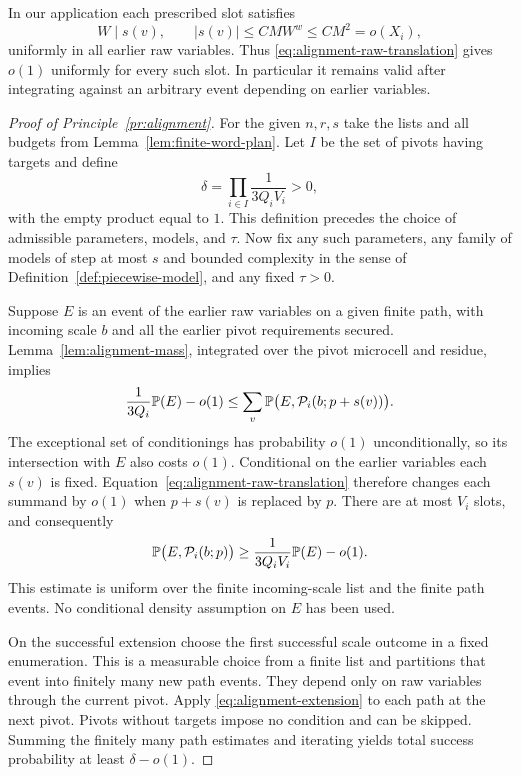 In our application each prescribed slot satisfies
\[
 W\mid s(v),\qquad |s(v)|\le C MW^w\le CM^2=o(X_i),
\]
uniformly in all earlier raw variables.  Thus
\eqref{eq:alignment-raw-translation} gives $o(1)$ uniformly for
every such slot.  In particular it remains valid after integrating
against an arbitrary event depending on earlier variables.

\begin{proof}[Proof of Principle~\ref{pr:alignment}]
For the given $n,r,s$ take the lists and all budgets from
Lemma~\ref{lem:finite-word-plan}.  Let $I$ be the set of pivots
having targets and define
\begin{equation}\label{eq:alignment-delta}
 \delta=\prod_{i\in I}\frac1{3Q_iV_i}>0,
\end{equation}
with the empty product equal to $1$.  This definition precedes
the choice of admissible parameters, models, and $\tau$.
Now fix any such parameters, any family of models of step at most
$s$ and bounded complexity in the sense of
Definition~\ref{def:piecewise-model}, and any fixed $\tau>0$.

Suppose $E$ is an event of the earlier raw variables on a given
finite path, with incoming scale $b$ and all the earlier pivot
requirements secured.  Lemma~\ref{lem:alignment-mass}, integrated
over the pivot microcell and residue, implies
\begin{equation}\label{eq:alignment-extension-shifted}
 \frac1{3Q_i}\mathbb P(E)-o(1)
 \le\sum_v\mathbb P\bigl(E,\mathcal P_i(b;p+s(v))\bigr).
\end{equation}
The exceptional set of conditionings has probability $o(1)$
unconditionally, so its intersection with $E$ also costs $o(1)$.
Conditional on the earlier variables each $s(v)$ is fixed.
Equation~\eqref{eq:alignment-raw-translation} therefore changes
each summand by $o(1)$ when $p+s(v)$ is replaced by $p$.  There
are at most $V_i$ slots, and consequently
\begin{equation}\label{eq:alignment-extension}
 \mathbb P\bigl(E,\mathcal P_i(b;p)\bigr)
 \ge\frac1{3Q_iV_i}\mathbb P(E)-o(1).
\end{equation}
This estimate is uniform over the finite incoming-scale list and
the finite path events.  No conditional density assumption on
$E$ has been used.

On the successful extension choose the first successful scale
outcome in a fixed enumeration.  This is a measurable choice
from a finite list and partitions that event into finitely many
new path events.  They depend only on raw variables through the
current pivot.  Apply \eqref{eq:alignment-extension} to each path
at the next pivot.  Pivots without targets impose no condition
and can be skipped.  Summing the finitely many path estimates
and iterating yields total success probability at least
$\delta-o(1)$.


\end{proof}
